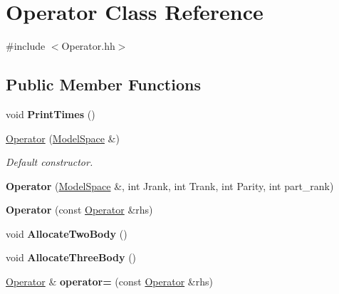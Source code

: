 \hypertarget{classOperator}{\section{Operator Class Reference}
\label{classOperator}
}


{\ttfamily \#include $<$Operator.\-hh$>$}

\subsection*{Public Member Functions}
\begin{DoxyCompactItemize}
\item 
\hypertarget{classOperator_aa8280e8e2c6be73a9594789127b939c1}{void {\bfseries Print\-Times} ()}\label{classOperator_aa8280e8e2c6be73a9594789127b939c1}

\item 
\hypertarget{classOperator_ae59dd1e9ea828f88637f001e987195b6}{\hyperlink{classOperator_ae59dd1e9ea828f88637f001e987195b6}{Operator} (\hyperlink{classModelSpace}{Model\-Space} \&)}\label{classOperator_ae59dd1e9ea828f88637f001e987195b6}

\begin{DoxyCompactList}\small\item\em Default constructor. \end{DoxyCompactList}\item 
\hypertarget{classOperator_ab120301ff79330ae6593fd13445f24f1}{{\bfseries Operator} (\hyperlink{classModelSpace}{Model\-Space} \&, int Jrank, int Trank, int Parity, int part\-\_\-rank)}\label{classOperator_ab120301ff79330ae6593fd13445f24f1}

\item 
\hypertarget{classOperator_ae229a22ab49ca258f69c1c2c267b2aeb}{{\bfseries Operator} (const \hyperlink{classOperator}{Operator} \&rhs)}\label{classOperator_ae229a22ab49ca258f69c1c2c267b2aeb}

\item 
\hypertarget{classOperator_aed04ab87654d93c3d1eec86860e41594}{void {\bfseries Allocate\-Two\-Body} ()}\label{classOperator_aed04ab87654d93c3d1eec86860e41594}

\item 
\hypertarget{classOperator_a72bde59e35fc1f0eb8b12286c411c7e9}{void {\bfseries Allocate\-Three\-Body} ()}\label{classOperator_a72bde59e35fc1f0eb8b12286c411c7e9}

\item 
\hypertarget{classOperator_afad114ba9dee8b9c08af0b5d27c3ba86}{\hyperlink{classOperator}{Operator} \& {\bfseries operator=} (const \hyperlink{classOperator}{Operator} \&rhs)}\label{classOperator_afad114ba9dee8b9c08af0b5d27c3ba86}


\end{DoxyCompactItemize}

